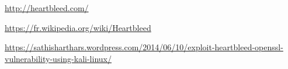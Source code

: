 \documentclass[a4paper,oneside,1pt]{article}
\begin{document}
\href{http://heartbleed.com/}{http://heartbleed.com/}

\href{https://fr.wikipedia.org/wiki/Heartbleed}{https://fr.wikipedia.org/wiki/Heartbleed}

\href{https://sathisharthars.wordpress.com/2014/06/10/exploit-heartbleed-openssl-vulnerability-using-kali-linux/}{https://sathisharthars.wordpress.com/2014/06/10/exploit-heartbleed-openssl-vulnerability-using-kali-linux/}





\end{document}
